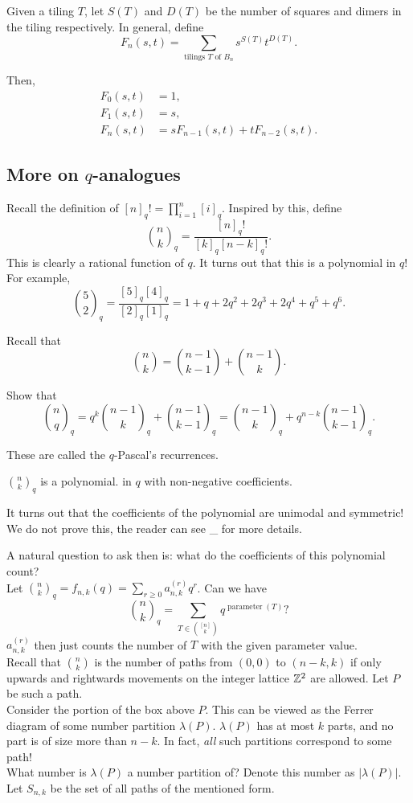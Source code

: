 	Given a tiling $T$, let $S(T)$ and $D(T)$ be the number of squares and dimers in the tiling respectively.
	In general, define
	\[ F_n(s,t) = \sum_{\text{tilings $T$ of $B_n$}} s^{S(T)} t^{D(T)}. \]

	Then,
	\begin{align*}
		F_0(s,t) &= 1, \\
		F_1(s,t) &= s, \\
		F_n(s,t) &= sF_{n-1}(s,t) + tF_{n-2}(s,t).
	\end{align*}

\subsection{More on $q$-analogues}

	Recall the definition of $[n]_q! = \prod_{i=1}^n [i]_q$. Inspired by this, define
	\[ \binom{n}{k}_q = \frac{[n]_q!}{[k]_q[n-k]_q!}. \]
	This is clearly a rational function of $q$. It turns out that this is a polynomial in $q$! For example,
	\[ \binom{5}{2}_q = \frac{[5]_q[4]_q}{[2]_q[1]_q} = 1 + q + 2q^2 + 2q^3 + 2q^4 + q^5 + q^6. \]

	Recall that
	\[ \binom{n}{k} = \binom{n-1}{k-1} + \binom{n-1}{k}. \]

	\begin{exercise}
		Show that
		\[ \binom{n}{q}_q = q^k \binom{n-1}{k}_q + \binom{n-1}{k-1}_q = \binom{n-1}{k}_q + q^{n-k} \binom{n-1}{k-1}_q . \]
	\end{exercise}
	These are called the $q$-Pascal's recurrences.

	\begin{fcor}
		$\binom{n}{k}_q$ is a polynomial. in $q$ with non-negative coefficients.
	\end{fcor}
	It turns out that the coefficients of the polynomial are unimodal and symmetric! We do not prove this, the reader can see \_ for more details.


	A natural question to ask then is: what do the coefficients of this polynomial count?\\
	Let $\binom{n}{k}_q = f_{n,k}(q) = \sum_{r \ge 0} a_{n,k}^{(r)} q^r$.
	Can we have
	\[ \binom{n}{k}_q = \sum_{T \in \binom{[n]}{k}} q^{\operatorname{parameter}(T)}? \]
	$a_{n,k}^{(r)}$ then just counts the number of $T$ with the given parameter value.\\
	Recall that $\binom{n}{k}$ is the number of paths from $(0,0)$ to $(n-k,k)$ if only upwards and rightwards movements on the integer lattice $\mathbb{Z}^2$ are allowed. Let $P$ be such a path.\\
	Consider the portion of the box above $P$. This can be viewed as the Ferrer diagram of some number partition $\lambda(P)$. $\lambda(P)$ has at most $k$ parts, and no part is of size more than $n-k$. In fact, \emph{all} such partitions correspond to some path!\\
	What number is $\lambda(P)$ a number partition of? Denote this number as $|\lambda(P)|$. Let $S_{n,k}$ be the set of all paths of the mentioned form. 

